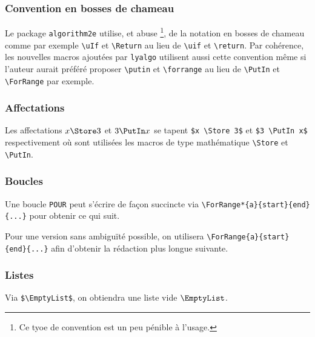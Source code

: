 \subsubsection{Convention en bosses de chameau}

Le package \verb+algorithm2e+ utilise, et abuse
\footnote{
	Ce tyoe de convention est un peu pénible à l'usage. 
},
de la notation en bosses de chameau comme par exemple \verb+\uIf+ et \verb+\Return+ au lieu de \verb+\uif+ et \verb+\return+.
Par cohérence, les nouvelles macros ajoutées par \verb+lyalgo+ utilisent aussi cette convention même si l'auteur aurait préféré proposer \verb+\putin+ et \verb+\forrange+ au lieu de \verb+\PutIn+ et \verb+\ForRange+ par exemple.




\subsubsection{Affectations}

Les affectations $x \Store 3$ et $3 \PutIn x$ se tapent \verb+$x \Store 3$+ et \verb+$3 \PutIn x$+ respectivement où sont utilisées les macros de type mathématique \verb+\Store+ et \verb+\PutIn+.




\subsubsection{Boucles}

Une boucle \verb+POUR+ peut s'écrire de façon succincte via \verb+\ForRange*{a}{start}{end}{...}+ pour obtenir ce qui suit.

\begin{algo}[.55]
\end{algo}


\medskip


Pour une version sans ambiguïté possible, on utilisera \verb+\ForRange{a}{start}{end}{...}+ afin d'obtenir la rédaction plus longue suivante.

\begin{algo}[.55]
\end{algo}




\subsubsection{Listes}

Via \verb+$\EmptyList$+, on obtiendra une liste vide $\EmptyList$.
